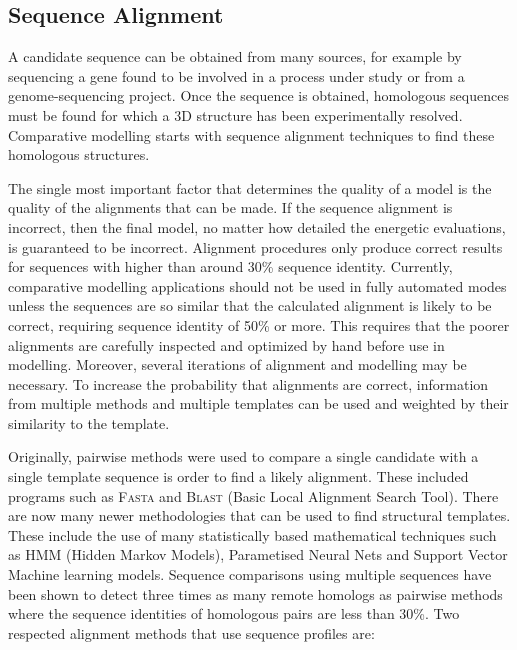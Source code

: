\subsection{Sequence Alignment}

A candidate sequence can be obtained from many sources, for example by sequencing a gene found to be involved in a process under study or from a genome-sequencing project. Once the sequence is obtained, homologous sequences must be found for which a 3D structure has been experimentally
resolved.
Comparative modelling starts with  sequence alignment techniques to find these homologous structures. 


The single most important factor that determines the quality of a model is the quality of the alignments that can be made. 
If the sequence alignment is incorrect, then the final model, no matter how detailed the energetic
evaluations, is guaranteed to be incorrect.
Alignment procedures only produce correct results for sequences with higher than around 30\% sequence identity\cite{NATIVE:Moult1999}. Currently, comparative
modelling applications should not be used in fully automated modes unless the sequences are so similar that the calculated alignment is likely to be correct, requiring sequence identity of 50\% or more. This requires that the poorer alignments are carefully inspected and optimized by hand before use in modelling. Moreover, several iterations of alignment and modelling may be necessary. To increase the probability that alignments are correct, information from multiple methods and multiple templates can be used and weighted by their similarity to the template.


Originally, pairwise methods were used to compare a single candidate  with a single template sequence is order to find a likely alignment. These included programs such as \textsc{Fasta}\cite{SEQUENCE:FASTA} and \textsc{Blast} (Basic Local Alignment Search Tool)\cite{SEQUENCE:BLAST}. There are now many newer methodologies that can be used to find structural templates. These include the use of many statistically based mathematical techniques such as HMM (Hidden Markov Models), Parametised Neural Nets and Support Vector Machine learning models. Sequence comparisons using multiple sequences have been shown to detect three times as many remote homologs as pairwise methods where the sequence identities of homologous pairs are less than 30\%\cite{SEQUENCE:Par98}. Two respected
alignment methods that use sequence profiles are:


